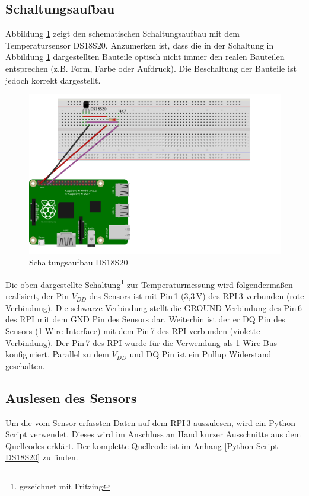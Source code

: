 \subsection{Schaltungsaufbau}
\label{subsection_Schaltungsaufbau_DS18S20}

Abbildung \ref{Abb_Schaltung_DS18S20} zeigt den schematischen Schaltungsaufbau mit dem Temperatursensor DS18S20. Anzumerken ist, dass die in der Schaltung in Abbildung \ref{Abb_Schaltung_DS18S20} dargestellten Bauteile optisch nicht immer den realen Bauteilen entsprechen (z.B. Form, Farbe oder Aufdruck). Die Beschaltung der Bauteile ist jedoch korrekt dargestellt. 

\begin{figure}[!h] 
  \centering
     \includegraphics[scale=.8]{BilderAllgemein/Schaltung_DS18S20.png}
  \caption{Schaltungsaufbau DS18S20}
  \label{Abb_Schaltung_DS18S20}
\end{figure}

Die oben dargestellte Schaltung\footnote{gezeichnet mit Fritzing} zur Temperaturmessung wird folgendermaßen realisiert, der Pin $V_{DD}$ des Sensors ist mit Pin\,1 (3,3\,V) des \ac{RPI}\,3 verbunden (rote Verbindung). Die schwarze Verbindung stellt die GROUND Verbindung des Pin\,6 des \ac{RPI} mit dem GND Pin des Sensors dar. Weiterhin ist der er DQ Pin des Sensors (1-Wire Interface) mit dem Pin\,7 des \ac{RPI} verbunden (violette Verbindung). Der Pin\,7 des \ac{RPI} wurde für die Verwendung als 1-Wire Bus konfiguriert. Parallel zu dem  $V_{DD}$ und DQ Pin ist ein Pullup Widerstand geschalten.

\subsection{Auslesen des Sensors}
\label{subsection_Auslesen_DS18S20}
Um die vom Sensor erfassten Daten auf dem \ac{RPI}\,3 auszulesen, wird ein Python Script verwendet. Dieses wird im Anschluss an Hand kurzer Ausschnitte aus dem Quellcodes erklärt. Der komplette Quellcode ist im Anhang \ref{Python Script DS18S20} zu finden.\\

